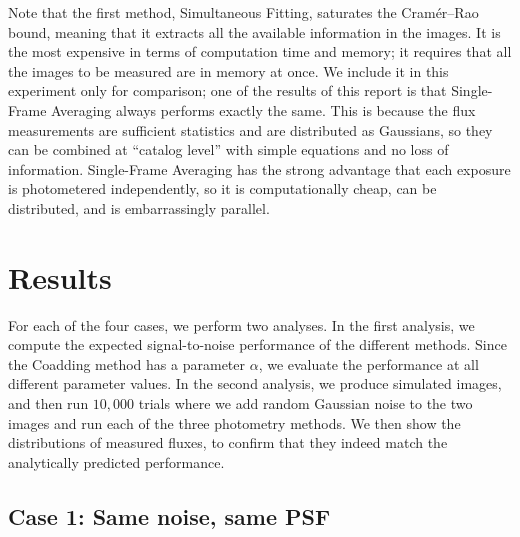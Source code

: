 \documentclass[a4paper,11pt]{article}
\begin{document}
Note that the first method, Simultaneous Fitting, saturates the
Cram\'er--Rao bound, meaning that it extracts all the available
information in the images.  It is the most expensive in terms of
computation time and memory; it requires that all the images to be
measured are in memory at once.  We include it in this experiment only
for comparison; one of the results of this report is that Single-Frame
Averaging always performs exactly the same.  This is because the flux
measurements are sufficient statistics and are distributed as
Gaussians, so they can be combined at ``catalog level'' with simple
equations and no loss of information.  Single-Frame Averaging has the
strong advantage that each exposure is photometered independently, so
it is computationally cheap, can be distributed, and is embarrassingly
parallel.

\newpage

\section{Results}

For each of the four cases, we perform two analyses.  In the first
analysis, we compute the expected signal-to-noise performance of the
different methods.  Since the Coadding method has a parameter
$\alpha$, we evaluate the performance at all different parameter
values.  In the second analysis, we produce simulated images, and then
run $10,000$ trials where we add random Gaussian noise to the two
images and run each of the three photometry methods.  We then show the
distributions of measured fluxes, to confirm that they indeed match
the analytically predicted performance.

\subsection*{Case 1: Same noise, same PSF}
\end{document}
